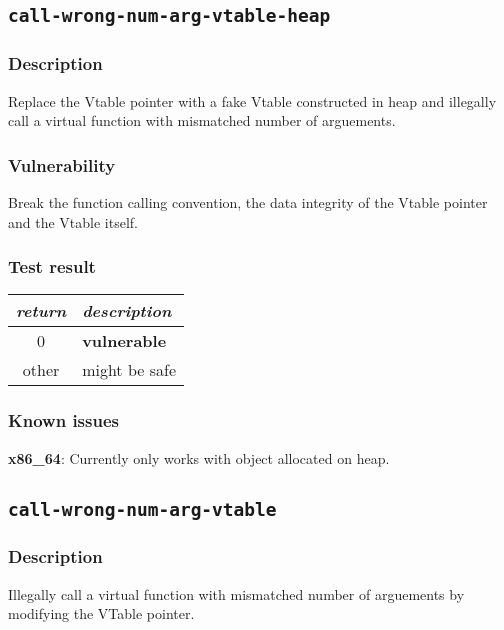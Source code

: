 \documentclass[a4paper]{book}
\begin{document}
\newpage

\subsection{\texttt{call-wrong-num-arg-vtable-heap}}\label{test-call-wrong-num-arg-vtable-heap}

\subsubsection{Description}
Replace the Vtable pointer with a fake Vtable constructed in heap and
illegally call a virtual function with mismatched number of arguements.

\subsubsection{Vulnerability}
Break the function calling convention, the data integrity of the Vtable pointer and the Vtable itself.

\subsubsection{Test result}
\begin{tabular}{cl}
  \toprule
  \emph{return}  & \emph{description} \\
  \midrule
  0              & \textbf{vulnerable} \\
  other          & might be safe \\
  \bottomrule
\end{tabular}

\subsubsection{Known issues}

\textbf{x86\_64}: Currently only works with object allocated on heap.


\newpage
\subsection{\texttt{call-wrong-num-arg-vtable}}\label{test-call-wrong-num-arg-vtable}

\subsubsection{Description}
Illegally call a virtual function with mismatched number of arguements by modifying the VTable pointer.
\end{document}
